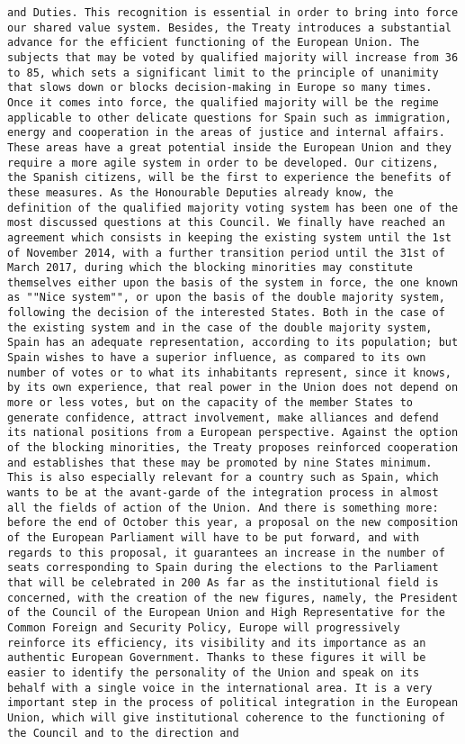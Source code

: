 \documentclass[
]{article}
\begin{document}
\begin{verbatim}
and Duties. This recognition is essential in order to bring into force our shared value system. Besides, the Treaty introduces a substantial advance for the efficient functioning of the European Union. The subjects that may be voted by qualified majority will increase from 36 to 85, which sets a significant limit to the principle of unanimity that slows down or blocks decision-making in Europe so many times. Once it comes into force, the qualified majority will be the regime applicable to other delicate questions for Spain such as immigration, energy and cooperation in the areas of justice and internal affairs. These areas have a great potential inside the European Union and they require a more agile system in order to be developed. Our citizens, the Spanish citizens, will be the first to experience the benefits of these measures. As the Honourable Deputies already know, the definition of the qualified majority voting system has been one of the most discussed questions at this Council. We finally have reached an agreement which consists in keeping the existing system until the 1st of November 2014, with a further transition period until the 31st of March 2017, during which the blocking minorities may constitute themselves either upon the basis of the system in force, the one known as ""Nice system"", or upon the basis of the double majority system, following the decision of the interested States. Both in the case of the existing system and in the case of the double majority system, Spain has an adequate representation, according to its population; but Spain wishes to have a superior influence, as compared to its own number of votes or to what its inhabitants represent, since it knows, by its own experience, that real power in the Union does not depend on more or less votes, but on the capacity of the member States to generate confidence, attract involvement, make alliances and defend its national positions from a European perspective. Against the option of the blocking minorities, the Treaty proposes reinforced cooperation and establishes that these may be promoted by nine States minimum. This is also especially relevant for a country such as Spain, which wants to be at the avant-garde of the integration process in almost all the fields of action of the Union. And there is something more: before the end of October this year, a proposal on the new composition of the European Parliament will have to be put forward, and with regards to this proposal, it guarantees an increase in the number of seats corresponding to Spain during the elections to the Parliament that will be celebrated in 200 As far as the institutional field is concerned, with the creation of the new figures, namely, the President of the Council of the European Union and High Representative for the Common Foreign and Security Policy, Europe will progressively reinforce its efficiency, its visibility and its importance as an authentic European Government. Thanks to these figures it will be easier to identify the personality of the Union and speak on its behalf with a single voice in the international area. It is a very important step in the process of political integration in the European Union, which will give institutional coherence to the functioning of the Council and to the direction and 
\end{verbatim}
\end{document}

